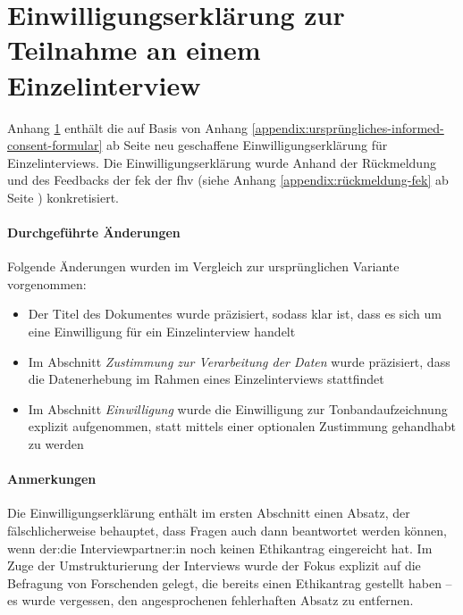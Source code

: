\documentclass[a4paper,12pt,twoside]{scrreprt}
\begin{document}


\cleardoublepage
\chapter{Einwilligungserklärung zur Teilnahme an einem Einzelinterview}
\label{appendix:informed-consent-einzelinterview}

Anhang \ref{appendix:informed-consent-einzelinterview} enthält die auf Basis von Anhang \ref{appendix:ursprüngliches-informed-consent-formular} ab Seite \pageref{appendix:ursprüngliches-informed-consent-formular} neu geschaffene Einwilligungserklärung für Einzelinterviews. Die Einwilligungserklärung wurde Anhand der Rückmeldung und des Feedbacks der \acl{fek} der \acl{fhv} (siehe Anhang \ref{appendix:rückmeldung-fek} ab Seite \pageref{appendix:rückmeldung-fek}) konkretisiert.

\subsubsection*{Durchgeführte Änderungen}
\label{appendix:änderungen-informed-consent-einzelinterview}

Folgende Änderungen wurden im Vergleich zur ursprünglichen Variante vorgenommen:
\begin{itemize}
    \item Der Titel des Dokumentes wurde präzisiert, sodass klar ist, dass es sich um eine Einwilligung für ein Einzelinterview handelt
    \item Im Abschnitt \textit{Zustimmung zur Verarbeitung der Daten} wurde präzisiert, dass die Datenerhebung im Rahmen eines Einzelinterviews stattfindet
    \item Im Abschnitt \textit{Einwilligung} wurde die Einwilligung zur Tonbandaufzeichnung explizit aufgenommen, statt mittels einer optionalen Zustimmung gehandhabt zu werden
\end{itemize}

\subsubsection*{Anmerkungen}
\label{appendix:anmerkungen-informed-consent-einzelinterview}

Die Einwilligungserklärung enthält im ersten Abschnitt einen Absatz, der fälschlicherweise behauptet, dass Fragen auch dann beantwortet werden können, wenn der:die Interviewpartner:in noch keinen Ethikantrag eingereicht hat. Im Zuge der Umstrukturierung der Interviews wurde der Fokus explizit auf die Befragung von Forschenden gelegt, die bereits einen Ethikantrag gestellt haben -- es wurde vergessen, den angesprochenen fehlerhaften Absatz zu entfernen.
\end{document}
